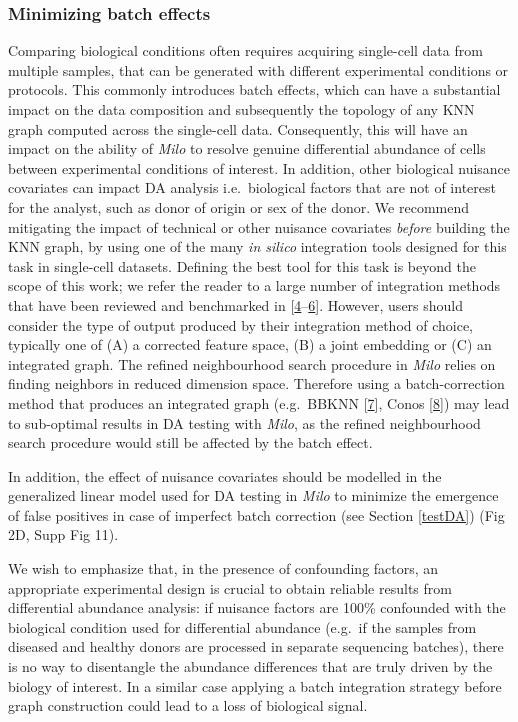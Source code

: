 \documentclass[
]{article}
\begin{document}
\hypertarget{minimizing-batch-effects}{%
\subsubsection{Minimizing batch effects}\label{minimizing-batch-effects}}

Comparing biological conditions often requires acquiring single-cell data from multiple samples, that can be generated with different experimental conditions or protocols. This commonly introduces batch effects, which can have a substantial impact on the data composition and subsequently the topology of any KNN graph computed across the single-cell data. Consequently, this will have an impact on the ability of \emph{Milo} to resolve genuine differential abundance of cells between experimental conditions of interest. In addition, other biological nuisance covariates can impact DA analysis i.e.~biological factors that are not of interest for the analyst, such as donor of origin or sex of the donor. We recommend mitigating the impact of technical or other nuisance covariates \emph{before} building the KNN graph, by using one of the many \emph{in silico} integration tools designed for this task in single-cell datasets.
Defining the best tool for this task is beyond the scope of this work; we refer the reader to a large number of integration methods that have been reviewed and benchmarked in {[}\protect\hyperlink{ref-lueckenBenchmarkingAtlaslevelData2020}{4}--\protect\hyperlink{ref-tranBenchmarkBatcheffectCorrection2020}{6}{]}. However, users should consider the type of output produced by their integration method of choice, typically one of (A) a corrected feature space, (B) a joint embedding or (C) an integrated graph. The refined neighbourhood search procedure in \emph{Milo} relies on finding neighbors in reduced dimension space. Therefore using a batch-correction method that produces an integrated graph (e.g.~BBKNN {[}\protect\hyperlink{ref-polanskiBBKNNFastBatch}{7}{]}, Conos {[}\protect\hyperlink{ref-barkasJointAnalysisHeterogeneous2019}{8}{]}) may lead to sub-optimal results in DA testing with \emph{Milo}, as the refined neighbourhood search procedure would still be affected by the batch effect.

In addition, the effect of nuisance covariates should be modelled in the generalized linear model used for DA testing in \emph{Milo} to minimize the emergence of false positives in case of imperfect batch correction (see Section \ref{testDA}) (Fig 2D, Supp Fig 11).

We wish to emphasize that, in the presence of confounding factors, an appropriate experimental design is crucial to obtain reliable results from differential abundance analysis: if nuisance factors are 100\% confounded with the biological condition used for differential abundance (e.g.~if the samples from diseased and healthy donors are processed in separate sequencing batches), there is no way to disentangle the abundance differences that are truly driven by the biology of interest. In a similar case applying a batch integration strategy before graph construction could lead to a loss of biological signal.
\end{document}
